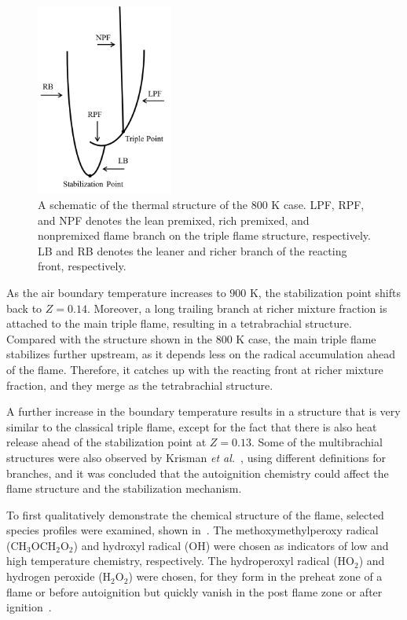 \documentclass[review,3p,times]{elsarticle}
\begin{document}
\begin{figure}[t]
  \centering
  \scriptsize
  \includegraphics[width=0.4\textwidth]{schematic_800.png}
  \normalsize
  \caption{A schematic of the thermal structure of the $800$ K case.  LPF, RPF, and NPF denotes the lean premixed, rich premixed, and nonpremixed flame branch on the triple flame structure, respectively.  LB and RB denotes the leaner and richer branch of the reacting front, respectively.}
  \label{fig:schematic_800}
\end{figure}

As the air boundary temperature increases to $900$ K, the stabilization point shifts back to $Z = 0.14$.  Moreover, a long trailing branch at richer mixture fraction is attached to the main triple flame, resulting in a tetrabrachial structure.  Compared with the structure shown in the $800$ K case, the main triple flame stabilizes further upstream, as it depends less on the radical accumulation ahead of the flame.  Therefore, it catches up with the reacting front at richer mixture fraction, and they merge as the tetrabrachial structure.

A further increase in the boundary temperature results in a structure that is very similar to the classical triple flame, except for the fact that there is also heat release ahead of the stabilization point at $Z = 0.13$.  Some of the multibrachial structures were also observed by Krisman \emph{et al.}~\cite{krisman14}, using different definitions for branches, and it was concluded that the autoignition chemistry could affect the flame structure and the stabilization mechanism.  

To first qualitatively demonstrate the chemical structure of the flame, selected species profiles were examined, shown in~.  The methoxymethylperoxy radical (CH$_3$OCH$_2$O$_2$) and hydroxyl radical (OH) were chosen as indicators of low and high temperature chemistry, respectively.  The hydroperoxyl radical (HO$_2$) and hydrogen peroxide (H$_2$O$_2$) were chosen, for they form in the preheat zone of a flame or before autoignition but quickly vanish in the post flame zone or after ignition~\cite{yoo09}.
\end{document}

